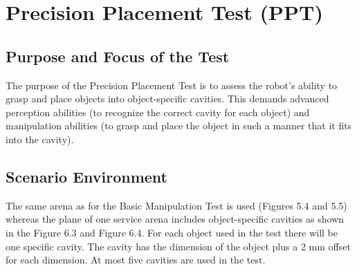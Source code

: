 \section{Precision Placement Test (PPT)}

\subsection{Purpose and Focus of the Test}
The purpose of the Precision Placement Test is to assess the robot’s ability to grasp and place objects into object-specific cavities. This demands advanced perception abilities (to recognize the correct cavity for each object) and manipulation abilities (to grasp and place the object in such a manner that it fits into the cavity).

\subsection{Scenario Environment}
The same arena as for the Basic Manipulation Test is used (Figures 5.4 and 5.5) whereas the plane of one service arena includes object-specific cavities as shown in the Figure 6.3 and Figure 6.4. For each object used in the test there will be one specific cavity. The cavity has the dimension of the object plus a 2 mm offset for each dimension. At most five cavities are used in the test.



